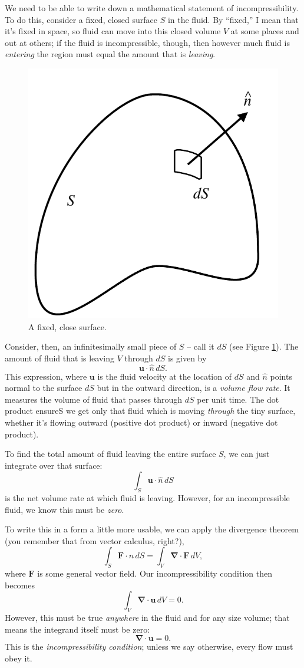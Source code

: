 We need to be able to write down a mathematical statement of incompressibility.  To do this, consider a fixed, closed surface $S$ in the fluid.  By ``fixed,'' I mean that it's fixed in space, so fluid can move into this closed volume $V$ at some places and out at others; if the fluid is incompressible, though, then however much fluid is \emph{entering} the region must equal the amount that is \emph{leaving}.  

\begin{figure}
\centering
\includegraphics[width=0.5\linewidth]{Figures/Chapter1/fig_closed_surface}
\caption{A fixed, close surface.}
\label{fig_closed_surface}
\end{figure}

Consider, then, an infinitesimally small piece of $S$ -- call it $dS$ (see Figure \ref{fig_closed_surface}).  The amount of fluid that is leaving $V$ through $dS$ is given by
\[
\mathbf{u} \cdot \hat{n} \, dS.
\]
This expression, where $\mathbf{u}$ is the fluid velocity at the location of $dS$ and $\hat{n}$ points normal to the surface $dS$ but in the outward direction, is a \emph{volume flow rate}.  It measures the volume of fluid that passes through $dS$ per unit time.  The dot product ensureS we get only that fluid which is moving \emph{through} the tiny surface, whether it's flowing outward (positive dot product) or inward (negative dot product).

To find the total amount of fluid leaving the entire surface $S$, we can just integrate over that surface:
\[
\int_S \mathbf{u} \cdot \hat{n} \, dS
\]
is the net volume rate at which fluid is leaving.  However, for an incompressible fluid, we know this must be \emph{zero}.

To write this in a form a little more usable, we can apply the divergence theorem (you remember that from vector calculus, right?),
\[
\int_S \mathbf{F} \cdot \hat{n} \, dS = \int_V \boldsymbol{\nabla} \cdot \mathbf{F} \, dV,
\]
where $\mathbf{F}$ is some general vector field.  Our incompressibility condition then becomes
\[
\int_V \boldsymbol{\nabla} \cdot \mathbf{u} \, dV = 0.
\]
However, this must be true \emph{anywhere} in the fluid and for any size volume; that means the integrand itself must be zero:
\begin{equation}
\label{eq_incompressibility}
\boxed{
\boldsymbol{\nabla} \cdot \mathbf{u} = 0.
}
\end{equation}
This is the \emph{incompressibility condition}; unless we say otherwise, every flow must obey it.

